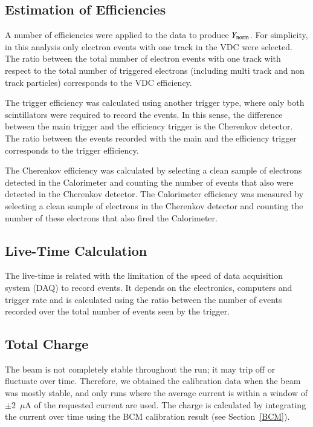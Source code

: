\documentclass[review,numbers,sort&compress]{elsarticle}
\begin{document}
\subsection{Estimation of Efficiencies} 
 
A number of efficiencies were applied to the data to produce $Y_{\rm{norm}}$.  For simplicity, in this analysis 
only electron events with one track in the VDC were selected.  
The ratio between the total number of electron events with one track with respect to the total number of triggered 
electrons (including multi track and non track particles) corresponds to the VDC efficiency. 

The trigger efficiency 
was calculated using another trigger type, where only both scintillators were required to record the events. 
In this sense, the difference between the main trigger and the efficiency trigger is the Cherenkov detector.  
The ratio between the events recorded with the main and the efficiency trigger corresponds to the trigger efficiency. 

The Cherenkov efficiency was calculated by selecting a clean sample of electrons detected in the Calorimeter 
and counting the number of events that also were detected in the Cherenkov detector. The Calorimeter efficiency 
was measured by selecting a clean sample of electrons in the Cherenkov detector and counting the number of 
these electrons that also fired the Calorimeter.

\subsection{Live-Time Calculation } 

The live-time is related with the limitation of the speed of data acquisition system (DAQ) to record events. It depends on the electronics, computers and trigger rate and is calculated using the ratio between the number of events recorded over the total number of events seen by the trigger. 

\subsection{ Total Charge}

The beam is not completely stable throughout the run; it may trip off or fluctuate over time.
Therefore, we obtained the calibration data when the beam was mostly stable, and only runs
where the average current is within a window of $\pm 2$~$\mu$A of the requested current are used. 
The charge is calculated by integrating the current over time using the BCM calibration result (see Section~\ref{BCM}).
\end{document}
